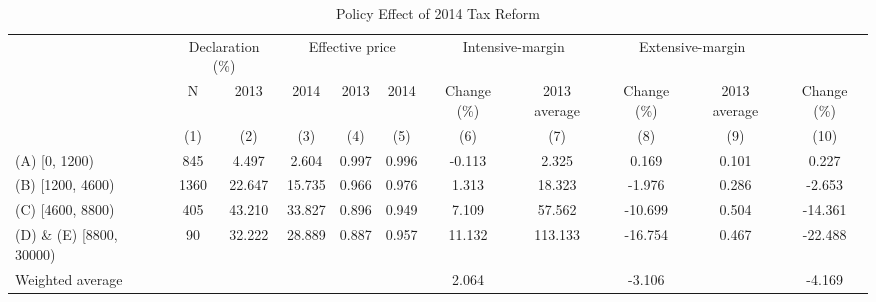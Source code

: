 \begin{table}

\caption{\label{tab:policy-effect}Policy Effect of 2014 Tax Reform}
\centering
\fontsize{7}{9}\selectfont
\begin{threeparttable}
\begin{tabular}[t]{>{\raggedright\arraybackslash}p{10em}cccccccccc}
\toprule
\multicolumn{2}{c}{ } & \multicolumn{2}{c}{Declaration (\%)} & \multicolumn{3}{c}{Effective price} & \multicolumn{2}{c}{Intensive-margin} & \multicolumn{2}{c}{Extensive-margin} \\
\cmidrule(l{3pt}r{3pt}){3-4} \cmidrule(l{3pt}r{3pt}){5-7} \cmidrule(l{3pt}r{3pt}){8-9} \cmidrule(l{3pt}r{3pt}){10-11}
\multicolumn{1}{c}{2013 Income bracket} & \multicolumn{1}{c}{N} & \multicolumn{1}{c}{2013} & \multicolumn{1}{c}{2014} & \multicolumn{1}{c}{2013} & \multicolumn{1}{c}{2014} & \multicolumn{1}{c}{Change (\%)} & \multicolumn{1}{c}{2013 average} & \multicolumn{1}{c}{Change (\%)} & \multicolumn{1}{c}{2013 average} & \multicolumn{1}{c}{Change (\%)} \\
\cmidrule(l{3pt}r{3pt}){1-1} \cmidrule(l{3pt}r{3pt}){2-2} \cmidrule(l{3pt}r{3pt}){3-3} \cmidrule(l{3pt}r{3pt}){4-4} \cmidrule(l{3pt}r{3pt}){5-5} \cmidrule(l{3pt}r{3pt}){6-6} \cmidrule(l{3pt}r{3pt}){7-7} \cmidrule(l{3pt}r{3pt}){8-8} \cmidrule(l{3pt}r{3pt}){9-9} \cmidrule(l{3pt}r{3pt}){10-10} \cmidrule(l{3pt}r{3pt}){11-11}
 & (1) & (2) & (3) & (4) & (5) & (6) & (7) & (8) & (9) & (10)\\
\midrule
(A) [0, 1200) & 845 & 4.497 & 2.604 & 0.997 & 0.996 & -0.113 & 2.325 & 0.169 & 0.101 & 0.227\\
(B) [1200, 4600) & 1360 & 22.647 & 15.735 & 0.966 & 0.976 & 1.313 & 18.323 & -1.976 & 0.286 & -2.653\\
(C) [4600, 8800) & 405 & 43.210 & 33.827 & 0.896 & 0.949 & 7.109 & 57.562 & -10.699 & 0.504 & -14.361\\
(D) \& (E) [8800, 30000) & 90 & 32.222 & 28.889 & 0.887 & 0.957 & 11.132 & 113.133 & -16.754 & 0.467 & -22.488\\
Weighted average &  &  &  &  &  & 2.064 &  & -3.106 &  & -4.169\\
\bottomrule
\end{tabular}
\begin{tablenotes}

\end{tablenotes}
\end{threeparttable}
\end{table}
